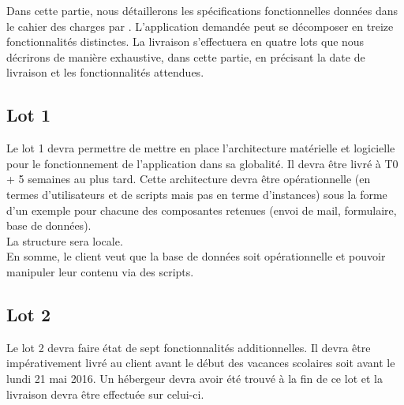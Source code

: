 \label{spec_fonct}
Dans cette partie, nous détaillerons les spécifications fonctionnelles données dans le cahier des charges par \nomClient. 
L'application demandée peut se décomposer en treize fonctionnalités distinctes. La livraison s'effectuera en quatre lots que nous décrirons de manière exhaustive, dans cette partie, en précisant la date de livraison et les fonctionnalités attendues. 

\subsection{Lot 1}

Le lot 1 devra permettre de mettre en place l'architecture matérielle et logicielle pour le fonctionnement de l'application dans sa globalité.
 Il devra être livré à T0 + 5 semaines au plus tard. Cette architecture devra être opérationnelle (en termes d'utilisateurs et de scripts mais pas en terme d'instances) sous la forme d'un exemple pour chacune des composantes retenues (envoi de mail, formulaire, base de données). \\
La structure sera locale.\\
En somme, le client veut que la base de données soit opérationnelle et pouvoir manipuler leur contenu via des scripts.
\\


\subsection{Lot 2}
Le lot 2 devra faire état de sept fonctionnalités additionnelles. Il devra être impérativement livré au client avant le début des vacances scolaires soit avant le lundi 21 mai 2016. Un hébergeur devra avoir été trouvé à la fin de ce lot et la livraison devra être effectuée sur celui-ci.

